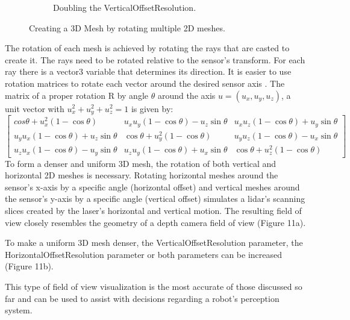 \documentclass{article}
\begin{document}
\begin{figure}
\begin{subfigure}[c]{1\textwidth}
   \caption{Doubling the VerticalOffsetResolution.}
\end{subfigure}
\caption[]{Creating a 3D Mesh by rotating multiple 2D meshes.}
\end{figure}

The rotation of each mesh is achieved by rotating the rays that are casted to create it. The rays need to be rotated relative to the sensor's transform. For each ray there is a vector3 variable that determines its direction. It is easier to use rotation matrices to rotate each vector around the desired sensor axis \cite{noauthor_rotation_2022}. The matrix of a proper rotation R by angle $\theta$ around the axis $u = (u_x, u_y, u_z)$, a unit vector with $ u_x^2 + u_y^2 + u_z^2 = 1 $ is given by:
\\

$
\begin{bmatrix}
cos \theta + u_x^2(1 - \cos \theta) & u_xu_y(1 - \cos \theta)  - u_z\sin \theta & u_xu_z(1 - \cos \theta) + u_y\sin \theta
\\
u_yu_x(1 - \cos \theta) + u_z\sin \theta & \cos \theta + u_y^2(1 - \cos \theta) & u_yu_z(1 - \cos \theta) - u_x\sin \theta
\\
u_zu_x(1 - \cos \theta) - u_y\sin \theta & u_zu_y(1 - \cos \theta) + u_x\sin \theta & \cos \theta + u_z^2(1 - \cos \theta) 
\end{bmatrix}
$
\\

To form a denser and uniform 3D mesh, the rotation of both vertical and horizontal 2D meshes is necessary. Rotating horizontal meshes around the sensor's x-axis by a specific angle (horizontal offset) and vertical meshes around the sensor's y-axis by a specific angle (vertical offset) simulates a lidar's scanning slices created by the laser's horizontal and vertical motion. The resulting field of view closely resembles the geometry of a depth camera field of view (Figure 11a).

To make a uniform 3D mesh denser, the VerticalOffsetResolution parameter, the HorizontalOffsetResolution parameter or both parameters can be increased (Figure 11b).

This type of field of view visualization is the most accurate of those discussed so far and can be used to assist with decisions regarding a robot's perception system. 
\end{document}
